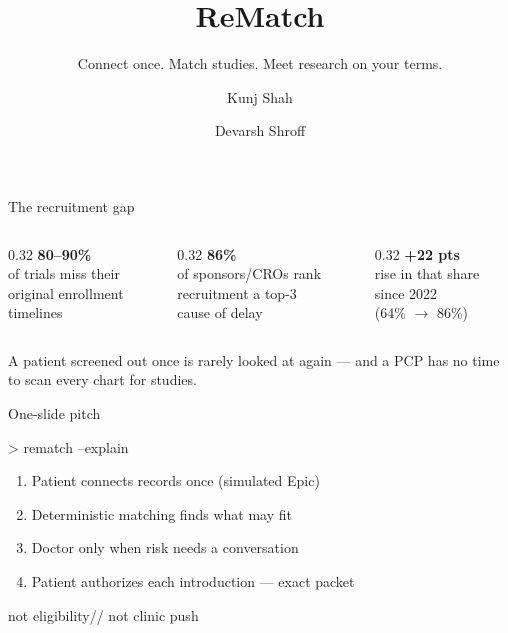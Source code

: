 \documentclass[aspectratio=169,10pt]{beamer}
\title[ReMatch]{ReMatch}
\subtitle{Connect once. Match studies. Meet research on your terms.}
\author{Kunj Shah \and Devarsh Shroff}
\institute{SacHacks}
\date{}
\begin{document}
\begin{frame}
  \titlepage
\end{frame}

\begin{frame}{The recruitment gap}
\begin{columns}[T]
\begin{column}{0.32\textwidth}
\centering
{\LARGE\bfseries 80--90\%}\\[4pt]
{\footnotesize of trials miss their\\original enrollment\\timelines}
\end{column}
\begin{column}{0.32\textwidth}
\centering
{\LARGE\bfseries 86\%}\\[4pt]
{\footnotesize of sponsors/CROs rank\\recruitment a top-3\\cause of delay}
\end{column}
\begin{column}{0.32\textwidth}
\centering
{\LARGE\bfseries +22 pts}\\[4pt]
{\footnotesize rise in that share\\since 2022\\(64\% $\rightarrow$ 86\%)}
\end{column}
\end{columns}
\vskip14pt
\begin{pbox}
\small
A patient screened out once is rarely looked at again --- and a PCP has no time to scan every chart for studies.
\end{pbox}
\end{frame}

\begin{frame}{One-slide pitch}
\begin{tbox}{> rematch --explain}
\small
\begin{enumerate}
\item Patient connects records once (simulated Epic)
\item Deterministic matching finds what may fit
\item Doctor only when risk needs a conversation
\item Patient authorizes each introduction --- exact packet
\end{enumerate}
\end{tbox}
\vskip10pt
\centering
{}\quad not eligibility\quad //\quad
{}\quad not clinic push
\end{frame}
\end{document}
